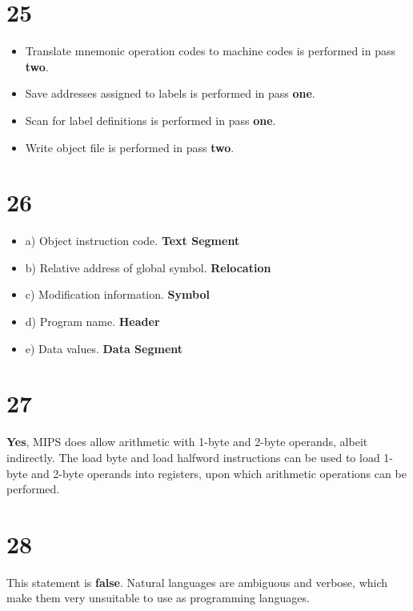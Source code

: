\documentclass[a4paper,11pt]{article}
\begin{document}

\section*{25}
\begin{itemize}
  \item Translate mnemonic operation codes to machine codes is performed in pass {\bf two}.
  \item Save addresses assigned to labels is performed in pass {\bf one}. 
  \item Scan for label definitions is performed in pass {\bf one}.
  \item Write object file is performed in pass {\bf two}.
\end{itemize}



\section*{26}
\begin{itemize}
  \item a) Object instruction code. {\bf Text Segment}
  \item b) Relative address of global symbol.  {\bf Relocation}
  \item c) Modification information. {\bf Symbol}
  \item d) Program name.  {\bf Header}  
  \item e) Data values. {\bf Data Segment}
\end{itemize}



\section*{27}
{\bf Yes}, MIPS does allow arithmetic with 1-byte and 2-byte operands, albeit indirectly.  The load byte and load halfword instructions can be used to load 1-byte and 2-byte operands into registers, upon which arithmetic operations can be performed. 


\section*{28}
This statement is {\bf false}.  Natural languages are ambiguous and verbose, which make them very unsuitable to use as programming languages.
\end{document}
